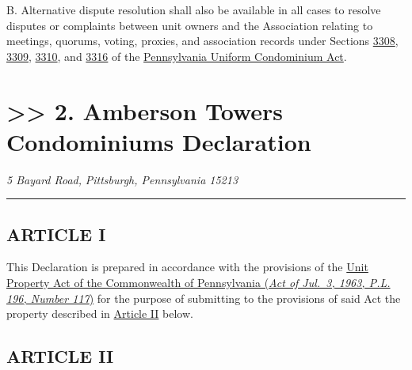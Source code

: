 \documentclass[
]{book}
\begin{document}
B. Alternative dispute resolution shall also be available in all cases to resolve disputes or complaints between unit owners and the Association relating to meetings, quorums, voting, proxies, and association records under Sections \href{https://www.legis.state.pa.us/cfdocs/legis/LI/consCheck.cfm?txtType=HTM\&ttl=68\&div=0\&chpt=33\&sctn=8\&subsctn=0}{3308}, \href{https://www.legis.state.pa.us/cfdocs/legis/LI/consCheck.cfm?txtType=HTM\&ttl=68\&div=0\&chpt=33\&sctn=9\&subsctn=0}{3309}, \href{https://www.legis.state.pa.us/cfdocs/legis/LI/consCheck.cfm?txtType=HTM\&ttl=68\&div=0\&chpt=33\&sctn=10\&subsctn=0}{3310}, and \href{https://www.legis.state.pa.us/cfdocs/legis/LI/consCheck.cfm?txtType=HTM\&ttl=68\&div=0\&chpt=33\&sctn=16\&subsctn=0}{3316} of the \href{https://www.legis.state.pa.us/cfdocs/legis/LI/consCheck.cfm?txtType=HTM\&ttl=68f}{Pennsylvania Uniform Condominium Act}.

\hypertarget{amberson-towers-condominiums-declaration}{%
\chapter*{\texorpdfstring{\textgreater\textgreater{} 2. Amberson Towers Condominiums Declaration}{\textgreater\textgreater{} 2. Amberson Towers Condominiums   Declaration}}\label{amberson-towers-condominiums-declaration}}

\emph{5 Bayard Road, }
\emph{Pittsburgh, Pennsylvania 15213}

\begin{center}\rule{0.5\linewidth}{0.5pt}\end{center}

\hypertarget{article-i}{%
\section*{ARTICLE I}\label{article-i}}

This Declaration is prepared in accordance with the provisions of the \href{https://www.legis.state.pa.us/WU01/LI/LI/US/PDF/1963/0/0117..PDF}{Unit Property Act of the Commonwealth of Pennsylvania (\emph{Act of Jul.~3, 1963, P.L. 196, Number 117})} for the purpose of submitting to the provisions of said Act the property described in \protect\hyperlink{ArtII}{Article II} below.

\hypertarget{article-ii}{%
\section*{ARTICLE II}\label{article-ii}}
\end{document}

